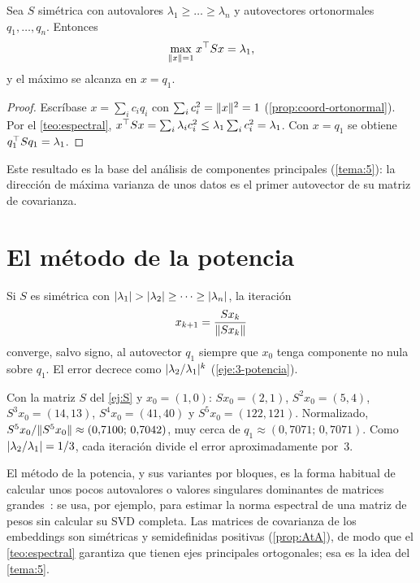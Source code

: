 \begin{proposicion}\label{prop:rayleigh}
Sea $S$ simétrica con autovalores $\lambda_1\ge\dots\ge\lambda_n$ y autovectores ortonormales $q_1,\dots,q_n$. Entonces
\[
\max_{\lVert x\rVert=1}x^{\top} Sx=\lambda_1,
\]
y el máximo se alcanza en $x=q_1$.
\end{proposicion}

\begin{proof}
Escríbase $x=\sum_i c_iq_i$ con $\sum_i c_i^{2}=\lVert x\rVert^{2}=1$ (\cref{prop:coord-ortonormal}). Por el \cref{teo:espectral}, $x^{\top} Sx=\sum_i\lambda_ic_i^{2}\le\lambda_1\sum_i c_i^{2}=\lambda_1$. Con $x=q_1$ se obtiene $q_1^{\top} Sq_1=\lambda_1$.
\end{proof}

Este resultado es la base del análisis de componentes principales (\cref{tema:5}): la dirección de máxima varianza de unos datos es el primer autovector de su matriz de covarianza.

\section{El método de la potencia}

Si $S$ es simétrica con $\lvert\lambda_1\rvert>\lvert\lambda_2\rvert\ge\dots\ge\lvert\lambda_n\rvert$, la iteración
\[
x_{k+1}=\frac{Sx_k}{\lVert Sx_k\rVert}
\]
converge, salvo signo, al autovector $q_1$ siempre que $x_0$ tenga componente no nula sobre $q_1$. El error decrece como $\lvert\lambda_2/\lambda_1\rvert^{k}$ (\cref{eje:3-potencia}).

\begin{ejemplo}\label{ej:potencia}
Con la matriz $S$ del \cref{ej:S} y $x_0=(1,0)$: $Sx_0=(2,1)$, $S^{2}x_0=(5,4)$, $S^{3}x_0=(14,13)$, $S^{4}x_0=(41,40)$ y $S^{5}x_0=(122,121)$. Normalizado, $S^{5}x_0/\lVert S^{5}x_0\rVert\approx(0{,}7100;\,0{,}7042)$, muy cerca de $q_1\approx(0{,}7071;\,0{,}7071)$. Como $\lvert\lambda_2/\lambda_1\rvert=1/3$, cada iteración divide el error aproximadamente por~3.
\end{ejemplo}

\begin{observacion}
El método de la potencia, y sus variantes por bloques, es la forma habitual de calcular unos pocos autovalores o valores singulares dominantes de matrices grandes~\cite[clase~12]{mit18065}: se usa, por ejemplo, para estimar la norma espectral de una matriz de pesos sin calcular su SVD completa. Las matrices de covarianza de los embeddings son simétricas y semidefinidas positivas (\cref{prop:AtA}), de modo que el \cref{teo:espectral} garantiza que tienen ejes principales ortogonales; esa es la idea del \cref{tema:5}.
\end{observacion}

